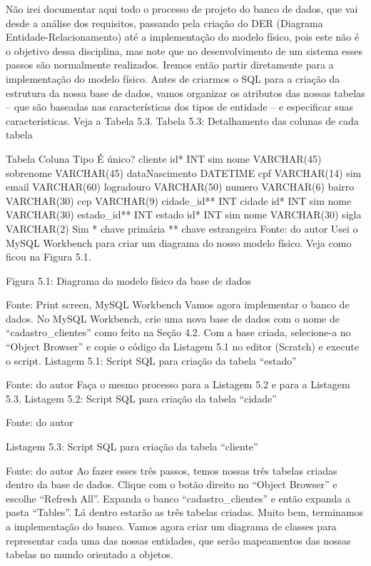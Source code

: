 Não irei documentar aqui todo o processo de projeto do banco de dados, que vai desde a análise dos requisitos, passando pela criação do DER (Diagrama Entidade-Relacionamento) até a implementação do modelo físico, pois este não é o objetivo dessa disciplina, mas note que no desenvolvimento de um sistema esses passos são normalmente realizados. Iremos então partir diretamente para a implementação do modelo físico. Antes de criarmos o SQL para a criação da estrutura da nossa base de dados, vamos organizar os atributos das nossas tabelas – que são baseadas nas características dos tipos de entidade – e especificar suas características. Veja a Tabela 5.3.
Tabela 5.3: Detalhamento das colunas de cada tabela

Tabela	Coluna	Tipo	É único?
cliente	id*	INT	sim
	nome	VARCHAR(45)	
	sobrenome	VARCHAR(45)	
	dataNascimento	DATETIME	
	cpf	VARCHAR(14)	sim
	email	VARCHAR(60)	
	logradouro	VARCHAR(50)	
	numero	VARCHAR(6)	
	bairro	VARCHAR(30)	
	cep	VARCHAR(9)	
	cidade\_id**	INT	
cidade	id*	INT	sim
	nome	VARCHAR(30)	
	estado\_id**	INT	
estado	id*	INT	sim
	nome	VARCHAR(30)	
	sigla	VARCHAR(2)	Sim
* chave primária
** chave estrangeira
Fonte: do autor
Usei o MySQL Workbench para criar um diagrama do nosso modelo físico. Veja como ficou na Figura 5.1.




Figura 5.1: Diagrama do modelo físico da base de dados
 
Fonte: Print screen, MySQL Workbench
Vamos agora implementar o banco de dados. No MySQL Workbench, crie uma nova base de dados com o nome de “cadastro\_clientes” como feito na Seção 4.2. Com a base criada, selecione-a no “Object Browser” e copie o código da Listagem 5.1 no editor (Scratch) e execute o script.
Listagem 5.1: Script SQL para criação da tabela “estado”
 
Fonte: do autor
Faça o mesmo processo para a Listagem 5.2 e para a Listagem 5.3.
Listagem 5.2: Script SQL para criação da tabela “cidade”
 
Fonte: do autor


Listagem 5.3: Script SQL para criação da tabela “cliente”
 
Fonte: do autor
Ao fazer esses três passos, temos nossas três tabelas criadas dentro da base de dados. Clique com o botão direito no “Object Browser” e escolhe “Refresh All”. Expanda o banco “cadastro\_clientes” e então expanda a pasta “Tables”. Lá dentro estarão as três tabelas criadas. Muito bem, terminamos a implementação do banco. Vamos agora criar um diagrama de classes para representar cada uma das nossas entidades, que serão mapeamentos das nossas tabelas no mundo orientado a objetos.



